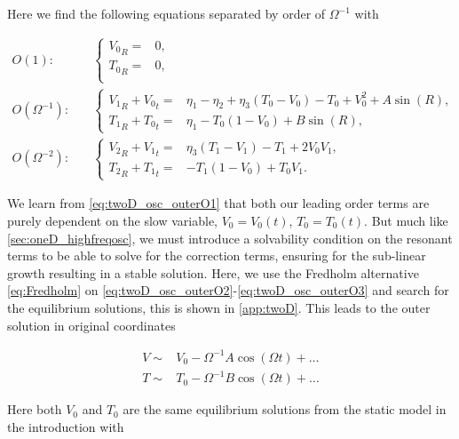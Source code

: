 Here we find the following equations separated by order of $\Omega^{-1}$ with

\begin{align}
\label{eq:twoD_osc_outerO1}
O(1):\quad & \begin{cases}
	{V_0}_R =&  0, \\
	{T_0}_R =&  0,\\
\end{cases}\\
\label{eq:twoD_osc_outerO2}
O(\Omega^{-1}):\quad & \begin{cases}
	{V_1}_R+{V_0}_t = & \eta_1-\eta_2+\eta_3(T_0-V_0)-T_0+V_0^2+A\sin(R),\\
	 {T_1}_R +{T_0}_t =&  \eta_1-T_0(1-V_0)+B\sin(R),
\end{cases}\\
\label{eq:twoD_osc_outerO3}
O(\Omega^{-2}):\quad & \begin{cases}
	{V_2}_R+{V_1}_t = & \eta_3(T_1-V_1)-T_1+2V_0V_1,\\
	 {T_2}_R +{T_1}_t =&  -T_1(1-V_0)+T_0V_1.
\end{cases}
\end{align}

We learn from \eqref{eq:twoD_osc_outerO1} that both our leading order terms are purely dependent on the slow variable, $V_0=V_0(t)$, $T_0=T_0(t)$. But much like \autoref{sec:oneD_highfreqosc}, we must introduce a solvability condition on the resonant terms to be able to solve for the correction terms, ensuring for the sub-linear growth resulting in a stable solution. Here, we use the Fredholm alternative \eqref{eq:Fredholm} on \eqref{eq:twoD_osc_outerO2}-\eqref{eq:twoD_osc_outerO3} and search for the equilibrium solutions, this is shown in \autoref{app:twoD}. This leads to the outer solution in original coordinates

\begin{equation}\label{eq:twoD_osc_outersoln}
\begin{aligned}
V\sim& V_0-\Omega^{-1} A\cos(\Omega t)+\dots\\
T\sim& T_0-\Omega^{-1} B\cos(\Omega t)+\ldots%
\end{aligned}
\end{equation}

Here both $V_0$ and $T_0$ are the same equilibrium solutions from the static model in the introduction with


